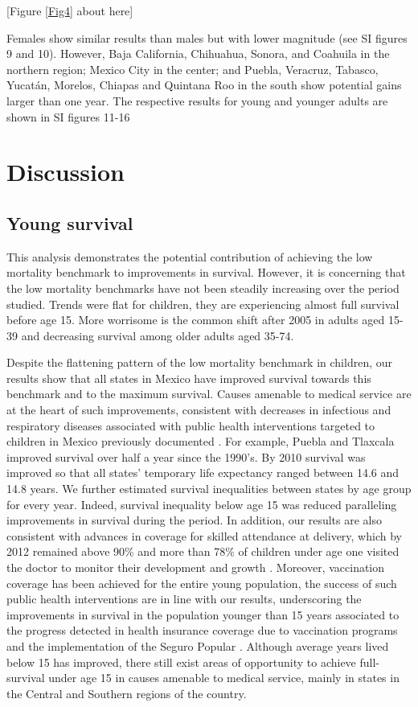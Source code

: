 \documentclass{bmcart}
\begin{document}
\begin{center}
[Figure \ref{Fig4} about here]
\end{center}


Females show similar results than males but with lower magnitude (see SI figures 9 and 10). However, Baja California, Chihuahua, Sonora, and Coahuila in the northern region; Mexico City in the center; and  Puebla, Veracruz, Tabasco, Yucat\'an, Morelos, Chiapas and Quintana Roo in the south show potential gains larger than one year. The respective results for young and younger adults are shown in SI figures 11-16


\section*{Discussion}
\subsection*{Young survival}

This analysis demonstrates the potential contribution of achieving the low mortality benchmark to improvements in survival. However, it is concerning that the low mortality benchmarks have not been steadily increasing over the period studied. Trends were flat for children, they are experiencing almost full survival before age 15. More worrisome is the common shift after 2005 in adults aged 15-39 and decreasing survival among older adults aged 35-74.

Despite the flattening pattern of the low mortality benchmark in children, our results show that all states in Mexico have improved survival towards this benchmark and to the maximum survival. Causes amenable to medical service are at the heart of such improvements, consistent with decreases in infectious and respiratory diseases associated with public health interventions targeted to children in Mexico previously documented \cite{sepulveda2006}. For example, Puebla and Tlaxcala improved survival over half a year since the 1990's. By 2010 survival was improved so that all states' temporary life expectancy ranged between 14.6 and 14.8 years. We further estimated survival inequalities between states by age group for every year.  Indeed, survival inequality below age 15 was reduced paralleling improvements in survival during the period. In addition, our results are also consistent with advances in coverage for skilled attendance at delivery, which by 2012 remained above 90\% and more than 78\% of children under age one visited the doctor to monitor their development and growth  \cite{urquieta2015evolution}. Moreover, vaccination coverage has been achieved for the entire young population, the success of such public health interventions are in line with our results, underscoring the improvements in survival in the population younger than 15 years associated to the progress detected in health insurance coverage due to vaccination programs and the implementation of the Seguro Popular \cite{urquieta2015evolution}. Although average years lived below 15 has improved, there still exist areas of opportunity to achieve full-survival under age 15 in causes amenable to medical service, mainly in states in the Central and Southern regions of the country. 
\end{document}
